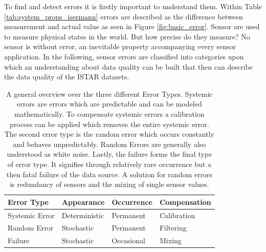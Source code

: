 To find and detect errors it is firstly important to understand them. Within Table \ref{tab:system_props_isermann} errors are described as the difference between measurement and actual value as seen in Figure \ref{fig:basic_error}. Sensor are used to measure physical states in the world. But how precise do they measure? No sensor is without error, an inevitable property accompanying every sensor application. In the following, sensor errors are classified into categories upon which an understanding about data quality can be built that then can describe the data quality of the ISTAR datasets.
\begin{table}[h]
    \centering
    \caption[Error Type Overview]{A general overview over the three different Error Types. Systemic errors are errors which are predictable and can be modeled mathematically. To compensate systemic errors a calibration process can be applied which removes the entire systemic error. The second error type is the random error which occurs constantly and behaves unpredictably. Random Errors are generally also understood as white noise. Lastly, the failure forms the final type of error type. It signifies through relatively rare occurrence but a then fatal failure of the data source. A solution for random errors is redundancy of sensors and the mixing of single sensor values.  \cite{hartmann_navigation-sensordatenfusion_2022}}
    \begin{tabular}{@{}llll@{}}
        \toprule
        Error Type     & Appearance    & Occurrence & Compensation \\ \midrule
        Systemic Error & Deterministic & Permanent  & Calibration  \\
        Random Error   & Stochastic    & Permanent  & Filtering    \\
        Failure        & Stochastic    & Occasional & Mixing       \\ \bottomrule
    \end{tabular}
    \label{tab:error_types}
\end{table}

